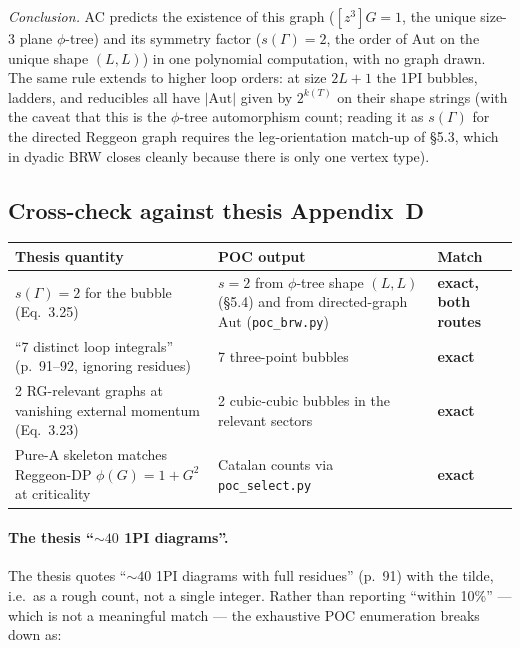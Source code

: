 \documentclass[11pt,a4paper]{article}
\begin{document}
\medskip
\noindent\textit{Conclusion.} AC predicts the existence of this graph
($[z^3]G = 1$, the unique size-$3$ plane $\phi$-tree) and its symmetry factor
($s(\Gamma)=2$, the order of $\mathrm{Aut}$ on the unique shape $(L,L)$) in
one polynomial computation, with no graph drawn. The same rule extends to
higher loop orders: at size $2L+1$ the 1PI bubbles, ladders, and reducibles
all have $|\mathrm{Aut}|$ given by $2^{k(T)}$ on their shape strings (with the
caveat that this is the $\phi$-tree automorphism count; reading it as
$s(\Gamma)$ for the directed Reggeon graph requires the leg-orientation
match-up of \S5.3, which in dyadic BRW closes cleanly because there is only
one vertex type).

\subsection{Cross-check against thesis Appendix~D}

\begin{center}
\small
\begin{tabular}{@{}p{6.5cm}p{4.0cm}p{2.0cm}@{}}
\toprule
Thesis quantity & POC output & Match \\
\midrule
$s(\Gamma) = 2$ for the bubble (Eq.~3.25) & $s = 2$ from $\phi$-tree shape $(L,L)$ (\S5.4) and from directed-graph $\mathrm{Aut}$ (\texttt{poc\_brw.py}) & \textbf{exact, both routes} \\
``7 distinct loop integrals'' (p.~91--92, ignoring residues) & 7 three-point bubbles & \textbf{exact} \\
2 RG-relevant graphs at vanishing external momentum (Eq.~3.23) & 2 cubic-cubic bubbles in the relevant sectors & \textbf{exact} \\
Pure-A skeleton matches Reggeon-DP $\phi(G)=1+G^2$ at criticality & Catalan counts via \texttt{poc\_select.py} & \textbf{exact} \\
\bottomrule
\end{tabular}
\end{center}

\paragraph{The thesis ``$\sim 40$ 1PI diagrams''.}
The thesis quotes ``$\sim 40$ 1PI diagrams with full residues'' (p.~91) with
the tilde, i.e.\ as a rough count, not a single integer. Rather than reporting
``within 10\%'' --- which is not a meaningful match --- the exhaustive POC
enumeration breaks down as:
\end{document}

